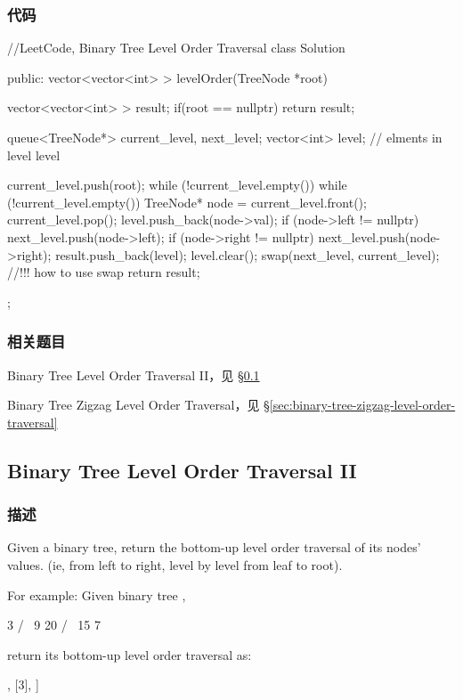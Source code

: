 \subsubsection{代码}
\begin{Code}
//LeetCode, Binary Tree Level Order Traversal
class Solution {
public:
    vector<vector<int> > levelOrder(TreeNode *root) {
        vector<vector<int> > result;
        if(root == nullptr) return result;

        queue<TreeNode*> current_level, next_level;
        vector<int> level; // elments in level level

        current_level.push(root);
        while (!current_level.empty()) {
            while (!current_level.empty()) {
                TreeNode* node = current_level.front();
                current_level.pop();
                level.push_back(node->val);
                if (node->left != nullptr) next_level.push(node->left);
                if (node->right != nullptr) next_level.push(node->right);
            }
            result.push_back(level);
            level.clear();
            swap(next_level, current_level); //!!! how to use swap
        }
        return result;
    }
};
\end{Code}


\subsubsection{相关题目}
\begindot
\item Binary Tree Level Order Traversal II，见 \S \ref{sec:binary-tree-tevel-order-traversal-ii}
\item Binary Tree Zigzag Level Order Traversal，见 \S \ref{sec:binary-tree-zigzag-level-order-traversal}
\myenddot


\subsection{Binary Tree Level Order Traversal II}
\label{sec:binary-tree-tevel-order-traversal-ii}


\subsubsection{描述}
Given a binary tree, return the bottom-up level order traversal of its nodes' values. (ie, from left to right, level by level from leaf to root).

For example:
Given binary tree ,
\begin{Code}
    3
   / \
  9  20
    /  \
   15   7
\end{Code}
return its bottom-up level order traversal as:
\begin{Code}
[
  [15,7]
  [9,20],
  [3],
]
\end{Code}



